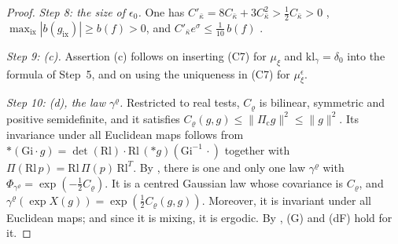 \documentclass[11pt,letterpaper,reqno]{amsart}
\theoremstyle{definition}
\begin{document}
\begin{proof}
\emph{Step 8: the size of $\epsilon_0$.}
One has $C'_{\bar\kappa}=\allowbreak 8C_{\bar\kappa}+3C_{\bar\kappa}^2>\frac12C_{\bar\kappa}>0$ \cite[Proposition~43.2, Constants]{QEDIII}, $\max_{\mathrm{ix}}|b(g_{\mathrm{ix}})|\ge b(f)>0$, and $C'_{\bar\kappa}e^\sigma\le\frac1{10}\,b(f)$ \cite[Chapter~44, (0.3)]{QEDIII}.

\emph{Step 9: (c).}
Assertion (c) follows on inserting (C7) for $\mu_\xi$ and $\mathrm{kl}_\gamma=\delta_0$ \cite[Theorem~14.26\,(c)]{QEDII} into the formula of Step~5, and on using the uniqueness in (C7) for $\mu_\xi^\epsilon$.

\emph{Step 10: (d), the law $\gamma^\varrho$.}
Restricted to real tests, $C_\varrho$ is bilinear, symmetric and positive semidefinite, and it satisfies $C_\varrho(g,g)\le\|\Pi_{\mathrm c}g\|^2\le\|g\|^2$.
Its invariance under all Euclidean maps follows from $\ast(\mathrm{Gi}\cdot g)=\allowbreak \det(\mathrm{Rl})\cdot\mathrm{Rl}\,\allowbreak (\ast g)(\mathrm{Gi}^{-1}\,\allowbreak \cdot)$ \cite[Lemma~9.12]{QEDI} together with $\Pi(\mathrm{Rl}\,p)=\mathrm{Rl}\,\Pi(p)\,\mathrm{Rl}^T$.
By \cite[Lemma~9.11\,(a)--(c)]{QEDI}, there is one and only one law $\gamma^\varrho$ with $\Phi_{\gamma^\varrho}=\exp(-\frac12C_\varrho)$.
It is a centred Gaussian law whose covariance is $C_\varrho$, and $\gamma^\varrho(\exp X(g))=\exp(\frac12C_\varrho(g,g))$.
Moreover, it is invariant under all Euclidean maps; and since it is mixing, it is ergodic.
By \cite[Remark~14.4]{QEDII}, (G) and (dF) hold for it.


\end{proof}
\end{document}
